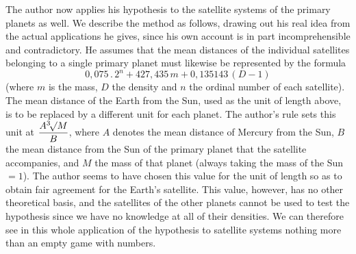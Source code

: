 The author now applies his hypothesis to the satellite systems of the primary planets as well. We describe the method as follows, drawing out his real idea from the actual applications he gives, since his own account is in part incomprehensible and contradictory. He assumes that the mean distances of the individual satellites belonging to a single primary planet must likewise be represented by the formula
\[ \mathrm{0{,}075} \,.\, 2^n + \mathrm{427{,}435}\, m + \mathrm{0{,}135143}\,(D - \mathrm{1}) \]
(where $m$ is the mass, $D$ the density and $n$ the ordinal number of each satellite). The mean distance of the Earth from the Sun, used as the unit of length above, is to be replaced by a different unit for each planet. The author’s rule sets this unit at $\dfrac{A\BareRoot[3]{M}}{B}$, where $A$ denotes the mean distance of Mercury from the Sun, $B$ the mean distance from the Sun of the primary planet that the satellite accompanies, and $M$ the mass of that planet (always taking the mass of the Sun $= \mathrm{1}$). The author seems to have chosen this value for the unit of length so as to obtain fair agreement for the Earth’s satellite. This value, however, has no other theoretical basis, and the satellites of the other planets cannot be used to test the hypothesis since we have no knowledge at all of their densities. We can therefore see in this whole application of the hypothesis to satellite systems nothing more than an empty game with numbers.
